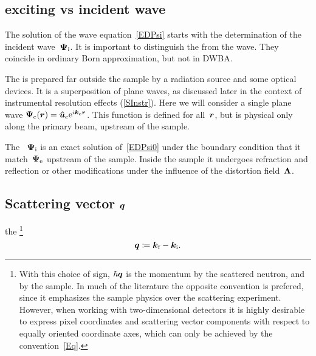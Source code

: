 \subsection*{exciting vs incident wave}

The solution of the wave equation~\cref{EDPsi}
starts with the determination of the incident wave~$\bm{\Psi}_{\text{i}}$.
%
%
%
%
%
%
%
It is important to distinguish the  from the  wave.
%
%
They coincide in ordinary Born approximation, but not in DWBA.

The 
is prepared far
outside the sample by a radiation source and some optical devices.
%
It is a superposition of plane waves,
as discussed later in the context of instrumental resolution effects
(\cref{SInstr}).
Here we will consider a single plane wave
$\bm{\Psi}_{\text{e}}(\bm{r})={\bm{\hat u}}_{\text{e}}\mathrm e^{i{\bm{k}}_{\text{e}}\bm{r}}$.
%
This function is defined for all~$\bm{r}$,
but is physical only along the primary beam, upstream of the sample.

The ~$\bm{\Psi}_{\text{i}}$
%
%
%
is an exact solution of~\cref{EDPsi0}
under the boundary condition that it match~$\bm{\Psi}_{\text{e}}$
upstream of the sample.
Inside the sample it undergoes refraction and reflection
or other modifications under the influence of the distortion field~$\bm{\Lambda}$.

\subsection*{Scattering vector $\bm{q}$}

 the \footnote
{With this choice of sign,
%
$\hbar\bm{q}$ is the momentum
%
 by the scattered neutron,
and  by the sample.
In much of the literature the opposite convention is prefered,
since it emphasizes the sample physics over the scattering experiment.
However, when working with two-dimensional detectors
it is highly desirable to express pixel coordinates
and scattering vector components
with respect to equally oriented coordinate axes,
which can only be achieved by the convention~\cref{Eq}.}
%
\begin{equation}\label{Eq}
  \q\coloneqq \k_\sf-\k_\si.
\end{equation}
%

